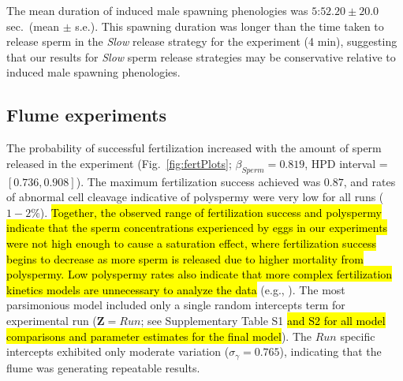 \documentclass{article}
\begin{document}
	The mean duration of induced male spawning phenologies was $5$:$52.20 \pm 20.0$ sec.~(mean $\pm$ s.e.). This spawning duration was longer than the time taken to release sperm in the \textit{Slow} release strategy for the  experiment (4 min), suggesting that our results for \textit{Slow} sperm release strategies may be conservative relative to induced male spawning phenologies.

	\subsection*{Flume experiments}

	The probability of successful fertilization increased with the amount of sperm released in the  experiment (Fig.~\ref{fig:fertPlots}; $\beta_{Sperm} = 0.819$, HPD interval = $[0.736,0.908]$). The maximum fertilization success achieved was $0.87$, and rates of abnormal cell cleavage indicative of polyspermy were very low for all runs ($1-2\%$). \hl{Together, the observed range of fertilization success and polyspermy indicate that the sperm concentrations experienced by eggs in our experiments were not high enough to cause a saturation effect, where fertilization success begins to decrease as more sperm is released due to higher mortality from polyspermy. Low polyspermy rates also indicate that more complex fertilization kinetics models are unnecessary to analyze the data} (e.g., \citealt{Vogel1982,MillarAnderson2003}). The most parsimonious model included only a single random intercepts term for experimental run ($\mathbf{Z} = Run$; see Supplementary Table S1 \hl{and S2 for all model comparisons and parameter estimates for the final model}). The $Run$ specific intercepts exhibited only moderate variation ($\sigma_{\gamma} = 0.765$), indicating that the flume was generating repeatable results.
\end{document}
